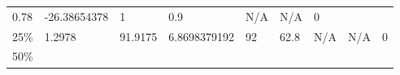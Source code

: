 \begin{longtable}[]{@{}lllllllll@{}}
\begin{minipage}[t]{0.09\columnwidth}
0.78\strut
\end{minipage} & \begin{minipage}[t]{0.09\columnwidth}\raggedright
-26.38654378\strut
\end{minipage} & \begin{minipage}[t]{0.08\columnwidth}\raggedright
1\strut
\end{minipage} & \begin{minipage}[t]{0.09\columnwidth}\raggedright
0.9\strut
\end{minipage} & \begin{minipage}[t]{0.09\columnwidth}\raggedright
N/A\strut
\end{minipage} & \begin{minipage}[t]{0.08\columnwidth}\raggedright
N/A\strut
\end{minipage} & \begin{minipage}[t]{0.11\columnwidth}\raggedright
0\strut
\end{minipage}\tabularnewline
\begin{minipage}[t]{0.05\columnwidth}\raggedright
25\%\strut
\end{minipage} & \begin{minipage}[t]{0.08\columnwidth}\raggedright
1.2978\strut
\end{minipage} & \begin{minipage}[t]{0.09\columnwidth}\raggedright
91.9175\strut
\end{minipage} & \begin{minipage}[t]{0.09\columnwidth}\raggedright
6.8698379192\strut
\end{minipage} & \begin{minipage}[t]{0.08\columnwidth}\raggedright
92\strut
\end{minipage} & \begin{minipage}[t]{0.09\columnwidth}\raggedright
62.8\strut
\end{minipage} & \begin{minipage}[t]{0.09\columnwidth}\raggedright
N/A\strut
\end{minipage} & \begin{minipage}[t]{0.08\columnwidth}\raggedright
N/A\strut
\end{minipage} & \begin{minipage}[t]{0.11\columnwidth}\raggedright
0\strut
\end{minipage}\tabularnewline
\begin{minipage}[t]{0.05\columnwidth}\raggedright
50\%\strut
\end{minipage} & \begin{minipage}[t]{0.08\columnwidth}\raggedright

\end{minipage}
\end{longtable}
